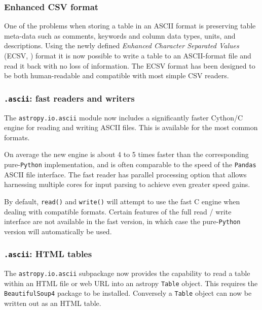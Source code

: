 \documentclass[modern]{aastex61}
\newcommand{\package}[1]{\texttt{#1}\xspace}
\newcommand{\python}{\package{Python}}
\begin{document}
\subsubsection{Enhanced CSV format}

One of the problems when storing a table in an ASCII format is
preserving table meta-data such as comments, keywords and column data
types, units, and descriptions. Using the newly defined \emph{Enhanced
Character Separated Values} (ECSV,  \citet{ape6}) format it is now
possible to write a table to an ASCII-format file and read it back
with no loss of information. The ECSV format has been designed to be
both human-readable and compatible with most simple CSV readers.

\subsubsection{\texttt{.ascii}: fast readers and writers}

The \package{astropy.io.ascii} module now includes a significantly
faster Cython/C engine for reading and writing ASCII files. This is
available for the most common formats.

On average the new engine is about
4 to 5 times faster than the corresponding pure-\python
implementation, and is often comparable to the speed of the
\package{Pandas} \citep{pandas} ASCII file interface.  The fast
reader has parallel processing option that allows harnessing
multiple cores for input parsing to achieve even greater speed
gains.

By default, \texttt{read()} and \texttt{write()} will attempt to use
the fast C engine when dealing with compatible formats. Certain
features of the full read / write interface are not available in the
fast version, in which case the pure-\python version will automatically
be used.

\subsubsection{\texttt{.ascii}: HTML tables}

The \package{astropy.io.ascii} subpackage now provides the capability
to read a table within an HTML file or web URL into an astropy
\texttt{Table} object. This requires the \package{BeautifulSoup4}
package to be installed.  Conversely a \texttt{Table} object can now
be written out as an HTML table.
\end{document}
